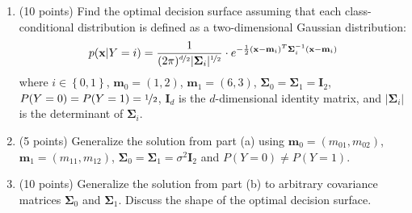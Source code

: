 \documentclass[twoside]{article}
\begin{document}
\begin{enumerate}
\item (10 points) Find the optimal decision surface assuming that each class-conditional distribution is defined as a two-dimensional Gaussian distribution:
\[
p(\mathbf{x}|Y=i)=\frac{1}{(2\pi)^{\nicefrac{d}{2}} |\mathbf{\Sigma}_{i}|^{\nicefrac{1}{2}}}\cdot e^{-\frac{1}{2}(\mathbf{x}-\mathbf{m}_{i})^{T}\mathbf{\Sigma}_{i}^{-1}(\mathbf{x}-\mathbf{m}_{i})}
\]
where $i \in \left\{ 0, 1\right\}$, $\mathbf{m}_{0}=(1,2)$, $\mathbf{m}_{1}=(6,3)$, $\mathbf{\Sigma}_{0}=\mathbf{\Sigma}_{1}=\mathbf{I}_2$, $P(Y=0)=P(Y=1)=\nicefrac{1}{2}$, $\mathbf{I}_d$ is the $d$-dimensional identity matrix, and $|\mathbf{\Sigma}_{i}|$ is the determinant of $\mathbf{\Sigma}_{i}$.
\item (5 points) Generalize the solution from part (a) using $\mathbf{m}_{0}=(m_{01}, m_{02})$, $\mathbf{m}_{1}=(m_{11}, m_{12})$, $\mathbf{\Sigma}_{0}=\mathbf{\Sigma}_{1}=\sigma^2 \mathbf{I}_2$ and $P(Y=0)\neq P(Y=1)$.
\item (10 points) Generalize the solution from part (b) to arbitrary covariance matrices $\mathbf{\Sigma}_{0}$ and $\mathbf{\Sigma}_{1}$. Discuss the shape of the optimal decision surface.
\end{enumerate}
\end{document}
